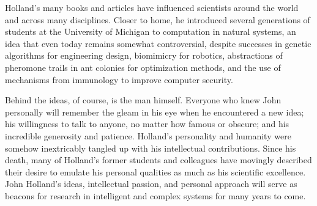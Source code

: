 \documentclass{sig-alternate}
\begin{document}
Holland's many books and articles have influenced scientists around
the world and across many disciplines.  Closer to home, he introduced
several generations of students at the University of Michigan to
computation in natural systems, an idea that even today remains
somewhat controversial, despite successes in genetic algorithms for
engineering design, biomimicry for robotics, abstractions of pheromone
trails in ant colonies for optimization methods, and the use of
mechanisms from immunology to improve computer security.

Behind the ideas, of course, is the man himself.   Everyone who knew
John personally will remember the gleam in his eye when he
encountered a new idea; his willingness to talk to anyone, no matter
how famous or obscure; and his incredible generosity and patience.
Holland's personality and humanity were somehow inextricably tangled
up with his intellectual contributions.  Since his death, many of
Holland's former students and colleagues have movingly described their
desire to emulate his personal qualities as much as his scientific
excellence.  John Holland's ideas, intellectual passion, and personal approach will serve as
beacons for research in intelligent and complex systems for many
years to come. 






\end{document}
